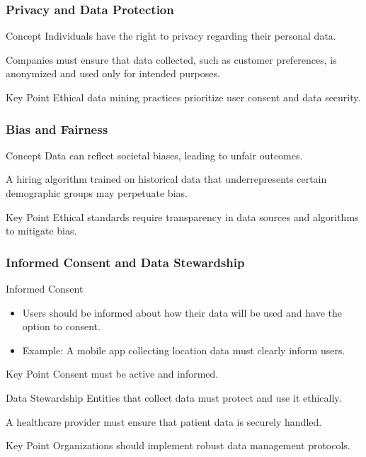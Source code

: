 \documentclass[aspectratio=169]{beamer}
\begin{document}
\begin{frame}[fragile]
    \frametitle{Privacy and Data Protection}
    \begin{block}{Concept}
        Individuals have the right to privacy regarding their personal data.
    \end{block}
    \begin{example}
        Companies must ensure that data collected, such as customer preferences, is anonymized and used only for intended purposes.
    \end{example}
    \begin{block}{Key Point}
        Ethical data mining practices prioritize user consent and data security.
    \end{block}
\end{frame}

\begin{frame}[fragile]
    \frametitle{Bias and Fairness}
    \begin{block}{Concept}
        Data can reflect societal biases, leading to unfair outcomes.
    \end{block}
    \begin{example}
        A hiring algorithm trained on historical data that underrepresents certain demographic groups may perpetuate bias.
    \end{example}
    \begin{block}{Key Point}
        Ethical standards require transparency in data sources and algorithms to mitigate bias.
    \end{block}
\end{frame}

\begin{frame}[fragile]
    \frametitle{Informed Consent and Data Stewardship}
    \begin{block}{Informed Consent}
        \begin{itemize}
            \item Users should be informed about how their data will be used and have the option to consent.
            \item Example: A mobile app collecting location data must clearly inform users.
        \end{itemize}
        \begin{block}{Key Point}
            Consent must be active and informed.
        \end{block}
    \end{block}
    
    \begin{block}{Data Stewardship}
        Entities that collect data must protect and use it ethically.
        \begin{example}
            A healthcare provider must ensure that patient data is securely handled.
        \end{example}
        \begin{block}{Key Point}
            Organizations should implement robust data management protocols.
        \end{block}
    \end{block}
\end{frame}
\end{document}
